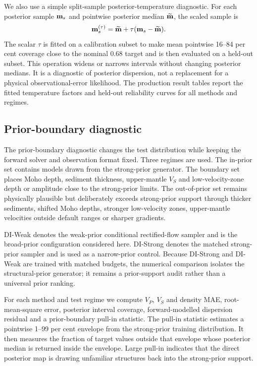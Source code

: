 \documentclass[referee]{gji}
\begin{document}
We also use a simple split-sample posterior-temperature diagnostic. For each posterior sample ${\bf m}_s$ and pointwise posterior median $\widetilde{\bf m}$, the scaled sample is
\begin{equation}
{\bf m}^{(\tau)}_s=
\widetilde{\bf m}+\tau({\bf m}_s-\widetilde{\bf m}).
\label{eq:temperature}
\end{equation}
The scalar $\tau$ is fitted on a calibration subset to make mean pointwise 16--84 per cent coverage close to the nominal 0.68 target and is then evaluated on a held-out subset. This operation widens or narrows intervals without changing posterior medians. It is a diagnostic of posterior dispersion, not a replacement for a physical observational-error likelihood. The production result tables report the fitted temperature factors and held-out reliability curves for all methods and regimes.

\subsection{Prior-boundary diagnostic}

The prior-boundary diagnostic changes the test distribution while keeping the forward solver and observation format fixed. Three regimes are used. The in-prior set contains models drawn from the strong-prior generator. The boundary set places Moho depth, sediment thickness, upper-mantle $V_S$ and low-velocity-zone depth or amplitude close to the strong-prior limits. The out-of-prior set remains physically plausible but deliberately exceeds strong-prior support through thicker sediments, shifted Moho depths, stronger low-velocity zones, upper-mantle velocities outside default ranges or sharper gradients.

DI-Weak denotes the weak-prior conditional rectified-flow sampler and is the broad-prior configuration considered here. DI-Strong denotes the matched strong-prior sampler and is used as a narrow-prior control. Because DI-Strong and DI-Weak are trained with matched budgets, the numerical comparison isolates the structural-prior generator; it remains a prior-support audit rather than a universal prior ranking.

For each method and test regime we compute $V_P$, $V_S$ and density MAE, root-mean-square error, posterior interval coverage, forward-modelled dispersion residual and a prior-boundary pull-in statistic. The pull-in statistic estimates a pointwise 1--99 per cent envelope from the strong-prior training distribution. It then measures the fraction of target values outside that envelope whose posterior median is returned inside the envelope. Large pull-in indicates that the direct posterior map is drawing unfamiliar structures back into the strong-prior support.
\end{document}
